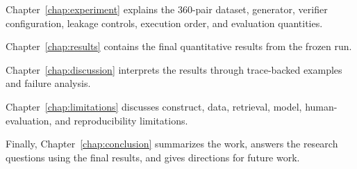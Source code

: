 Chapter~\ref{chap:experiment} explains the 360-pair dataset, generator, verifier configuration, leakage controls, execution order, and evaluation quantities.

Chapter~\ref{chap:results} contains the final quantitative results from the frozen run.

Chapter~\ref{chap:discussion} interprets the results through trace-backed examples and failure analysis.

Chapter~\ref{chap:limitations} discusses construct, data, retrieval, model, human-evaluation, and reproducibility limitations.

Finally, Chapter~\ref{chap:conclusion} summarizes the work, answers the research questions using the final results, and gives directions for future work.
